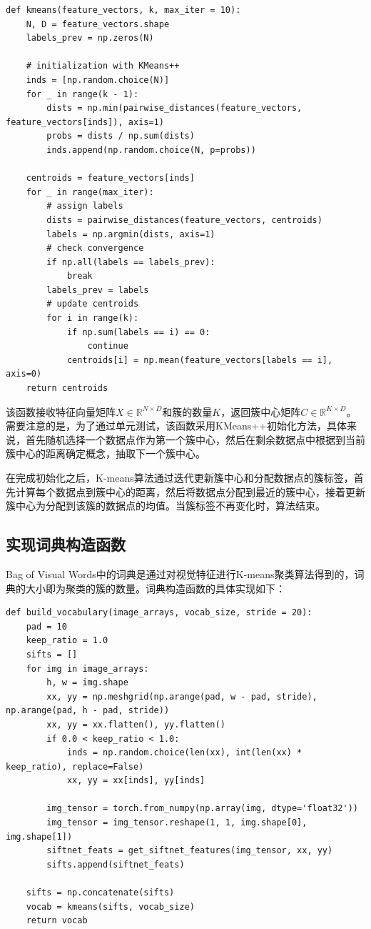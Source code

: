 \newpage
\begin{lstlisting}[style=Python]
def kmeans(feature_vectors, k, max_iter = 10):
    N, D = feature_vectors.shape
    labels_prev = np.zeros(N)

    # initialization with KMeans++
    inds = [np.random.choice(N)]
    for _ in range(k - 1):
        dists = np.min(pairwise_distances(feature_vectors, feature_vectors[inds]), axis=1)
        probs = dists / np.sum(dists)
        inds.append(np.random.choice(N, p=probs))

    centroids = feature_vectors[inds]
    for _ in range(max_iter):
        # assign labels
        dists = pairwise_distances(feature_vectors, centroids)
        labels = np.argmin(dists, axis=1)
        # check convergence
        if np.all(labels == labels_prev):
            break
        labels_prev = labels
        # update centroids
        for i in range(k):
            if np.sum(labels == i) == 0:
                continue
            centroids[i] = np.mean(feature_vectors[labels == i], axis=0)
    return centroids
\end{lstlisting}

该函数接收特征向量矩阵$X\in\mathbb{R}^{N\times D}$和簇的数量$K$，返回簇中心矩阵$C\in\mathbb{R}^{K\times D}$。需要注意的是，为了通过单元测试，该函数采用KMeans++初始化方法，具体来说，首先随机选择一个数据点作为第一个簇中心，然后在剩余数据点中根据到当前簇中心的距离确定概念，抽取下一个簇中心。

在完成初始化之后，K-means算法通过迭代更新簇中心和分配数据点的簇标签，首先计算每个数据点到簇中心的距离，然后将数据点分配到最近的簇中心，接着更新簇中心为分配到该簇的数据点的均值。当簇标签不再变化时，算法结束。

\subsection{实现词典构造函数}

Bag of Visual Words中的词典是通过对视觉特征进行K-means聚类算法得到的，词典的大小即为聚类的簇的数量。词典构造函数的具体实现如下：

\begin{lstlisting}[style=Python]
def build_vocabulary(image_arrays, vocab_size, stride = 20):
    pad = 10
    keep_ratio = 1.0
    sifts = []
    for img in image_arrays:
        h, w = img.shape
        xx, yy = np.meshgrid(np.arange(pad, w - pad, stride), np.arange(pad, h - pad, stride))
        xx, yy = xx.flatten(), yy.flatten()
        if 0.0 < keep_ratio < 1.0:
            inds = np.random.choice(len(xx), int(len(xx) * keep_ratio), replace=False)
            xx, yy = xx[inds], yy[inds]
        
        img_tensor = torch.from_numpy(np.array(img, dtype='float32'))
        img_tensor = img_tensor.reshape(1, 1, img.shape[0], img.shape[1])
        siftnet_feats = get_siftnet_features(img_tensor, xx, yy)
        sifts.append(siftnet_feats)
                
    sifts = np.concatenate(sifts)
    vocab = kmeans(sifts, vocab_size)
    return vocab
\end{lstlisting}


